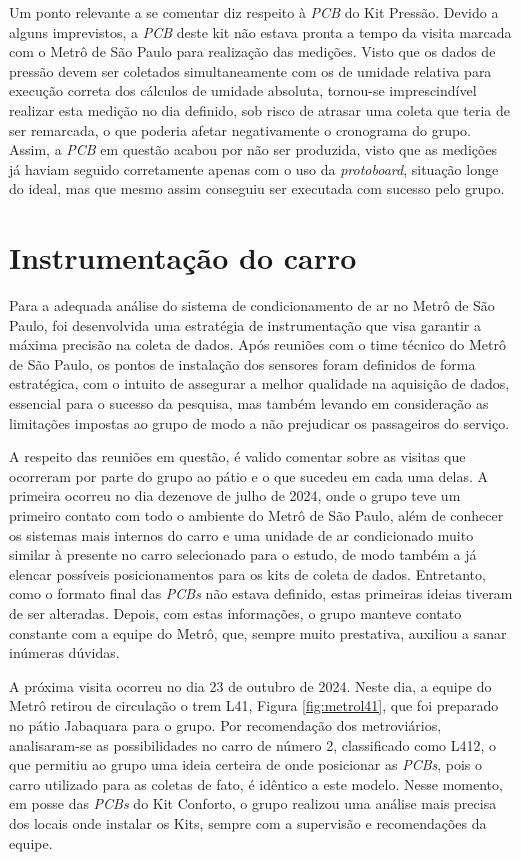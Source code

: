 \documentclass[acronym,symbols,table]{fei}
\begin{document}
\newpage
Um ponto relevante a se comentar diz respeito à \textit{PCB} do Kit Pressão. Devido a alguns imprevistos, a \textit{PCB} deste kit não estava pronta a tempo da visita marcada com o Metrô de São Paulo para realização das medições. Visto que os dados de pressão devem ser coletados simultaneamente com os de umidade relativa para execução correta dos cálculos de umidade absoluta, tornou-se imprescindível realizar esta medição no dia definido, sob risco de atrasar uma coleta que teria de ser remarcada, o que poderia afetar negativamente o cronograma do grupo. Assim, a \textit{PCB} em questão acabou por não ser produzida, visto que as medições já haviam seguido corretamente apenas com o uso da \textit{protoboard}, situação longe do ideal, mas que mesmo assim conseguiu ser executada com sucesso pelo grupo.


\section{Instrumentação do carro} \label{instruvagao}

Para a adequada análise do sistema de condicionamento de ar no Metrô de São Paulo, foi desenvolvida uma estratégia de instrumentação que visa garantir a máxima precisão na coleta de dados. Após reuniões com o time técnico do Metrô de São Paulo, os pontos de instalação dos sensores foram definidos de forma estratégica, com o intuito de assegurar a melhor qualidade na aquisição de dados, essencial para o sucesso da pesquisa, mas também levando em consideração as limitações impostas ao grupo de modo a não prejudicar os passageiros do serviço.

A respeito das reuniões em questão, é valido comentar sobre as visitas que ocorreram por parte do grupo ao pátio e o que sucedeu em cada uma delas. A primeira ocorreu no dia dezenove de julho de 2024, onde o grupo teve um primeiro contato com todo o ambiente do Metrô de São Paulo, além de conhecer os sistemas mais internos do carro e uma unidade de ar condicionado muito similar à presente no carro selecionado para o estudo, de modo também a já elencar possíveis posicionamentos para os kits de coleta de dados. Entretanto, como o formato final das \textit{PCBs} não estava definido, estas primeiras ideias tiveram de ser alteradas. Depois, com estas informações, o grupo manteve contato constante com a equipe do Metrô, que, sempre muito prestativa, auxiliou a sanar inúmeras dúvidas.

A próxima visita ocorreu no dia 23 de outubro de 2024. Neste dia, a equipe do Metrô retirou de circulação o trem L41, Figura \ref{fig:metrol41}, que foi preparado no pátio Jabaquara para o grupo. Por recomendação dos metroviários, analisaram-se as possibilidades no carro de número 2, classificado como L412, o que permitiu ao grupo uma ideia certeira de onde posicionar as \textit{PCBs}, pois o carro utilizado para as coletas de fato, é idêntico a este modelo. Nesse momento, em posse das \textit{PCBs} do Kit Conforto, o grupo realizou uma análise mais precisa dos locais onde instalar os Kits, sempre com a supervisão e recomendações da equipe.
\end{document}
